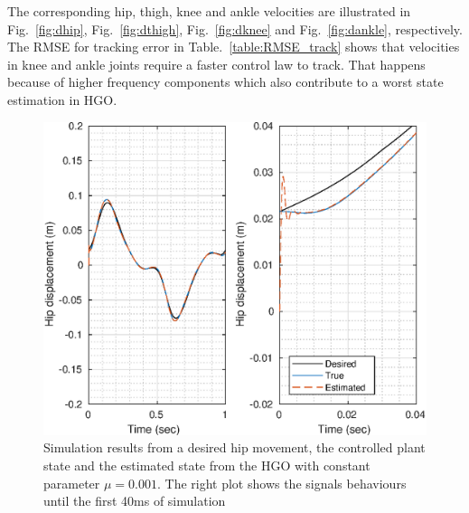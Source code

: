 \documentclass[letterpaper, 10 pt, journal, twocolumn]{IEEEtran}  %
\theoremstyle{plain}
\theoremstyle{definition}
\theoremstyle{remark}
\begin{document}
The corresponding hip, thigh, knee and ankle velocities are illustrated in Fig.~\ref{fig:dhip}, Fig.~\ref{fig:dthigh}, Fig.~\ref{fig:dknee} and Fig.~\ref{fig:dankle}, respectively. The RMSE for tracking error in Table.~\ref{table:RMSE_track} shows that velocities in knee and ankle joints require a faster control law to track. That happens because of higher frequency components which also contribute to a worst state estimation in HGO.
%
%
%
%
%
%
%
%
%
\begin{figure}[h!]
	\begin{center}
	\includegraphics[scale = 0.5]{Figs/q_hip_mu_1e-03.eps}
	\caption{ Simulation results from a desired hip movement, the controlled plant state and the estimated state from the HGO with constant parameter $\mu=0.001$. The right plot shows the signals behaviours until the first 40ms of simulation}
	\label{fig:hip}
	\end{center}
\end{figure}
%
%
\end{document}

